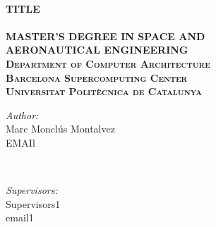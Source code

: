 \center %



\HRule \\[0.4cm]
{ \huge \bfseries TITLE}\\[0.4cm] %
\HRule \\[1.0cm]

\textsc{\huge \textbf{MASTER'S DEGREE IN SPACE AND\\[0.5cm] AERONAUTICAL ENGINEERING }}\\[1.5cm]


\textsc{\Large \textbf{Department of Computer Architecture \\[0.07cm] Barcelona Supercomputing Center \\[0.24cm] Universitat Polit\`ecnica de Catalunya}}\\[1.5cm]








\vspace{0.8cm}
\begin{minipage}{0.4\textwidth}
\begin{flushleft} \large
\Large \emph{Author:}\\[0.1cm]
\Large Marc Monclús Montalvez \\
EMAIl
\end{flushleft}
\end{minipage}
~
\begin{minipage}{0.4\textwidth}
\begin{flushright} \large
\Large \emph{Supervisors:} \\[0.1cm]
\Large Supervisors1 \\
email1 \\[0.1cm]
\end{flushright}
\vspace{-1.47cm}
\end{minipage}\\[3cm]

